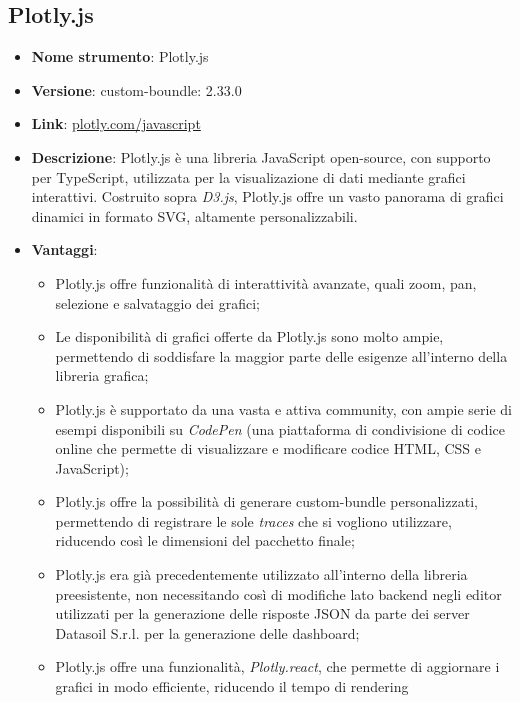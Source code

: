 
\subsection{Plotly.js}
\begin{itemize}
\item \textbf{Nome strumento}: Plotly.js
\item \textbf{Versione}: custom-boundle: 2.33.0
\item \textbf{Link}: \href{https://plotly.com/javascript/}{plotly.com/javascript}
\item \textbf{Descrizione}: Plotly.js è una libreria JavaScript open-source, con supporto per TypeScript, utilizzata per la visualizazione di dati mediante grafici interattivi.
Costruito sopra \textit{D3.js}, Plotly.js offre un vasto panorama di grafici dinamici in formato SVG, altamente personalizzabili.
\item \textbf{Vantaggi}:
\begin{itemize}
    \item Plotly.js offre funzionalità di interattività avanzate, quali zoom, pan, selezione e salvataggio dei grafici;
    \item Le disponibilità di grafici offerte da Plotly.js sono molto ampie, permettendo di soddisfare la maggior parte delle esigenze
          all'interno della libreria grafica;
    \item Plotly.js è supportato da una vasta e attiva community, con ampie serie di esempi disponibili su \textit{CodePen} (una piattaforma di condivisione di codice
          online che permette di visualizzare e modificare codice HTML, CSS e JavaScript);
    \item Plotly.js offre la possibilità di generare custom-bundle personalizzati, permettendo di registrare le sole \textit{traces} che si vogliono utilizzare, riducendo
          così le dimensioni del pacchetto finale;
    \item Plotly.js era già precedentemente utilizzato all'interno della libreria preesistente, non necessitando così di modifiche lato backend negli editor
          utilizzati per la generazione delle risposte JSON da parte dei server Datasoil S.r.l. per la generazione delle dashboard;
    \item Plotly.js offre una funzionalità, \textit{Plotly.react}, che permette di aggiornare i grafici in modo efficiente, riducendo il tempo di rendering

\end{itemize}
\end{itemize}
